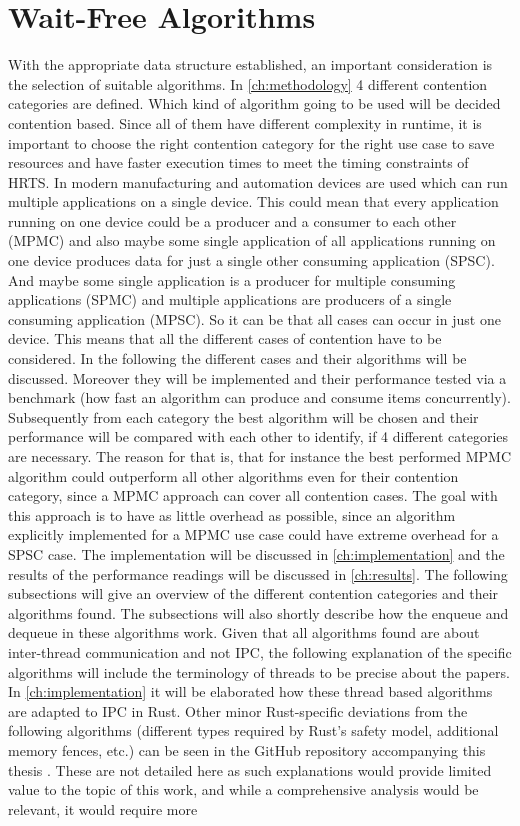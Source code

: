 \section{Wait-Free Algorithms}\label{sec:wait-free-alg}
With the appropriate data structure established, an important consideration is the selection of suitable algorithms. In \cref{ch:methodology} 4 different contention categories are defined. Which kind of algorithm going to be used will be decided contention based. Since all of them have different complexity in runtime, it is important to choose the right contention category for the right use case to save resources and have faster execution times to meet the timing constraints of \ac{HRTS}. In modern manufacturing and automation devices are used which can run multiple applications on a single device. This could mean that every application running on one device could be a producer and a consumer to each other (\ac{MPMC}) and also maybe some single application of all applications running on one device produces data for just a single other consuming application (\ac{SPSC}). And maybe some single application is a producer for multiple consuming applications (\ac{SPMC}) and multiple applications are producers of a single consuming application (\ac{MPSC}). So it can be that all cases can occur in just one device. This means that all the different cases of contention have to be considered. In the following the different cases and their algorithms will be discussed. Moreover they will be implemented and their performance tested via a benchmark (how fast an algorithm can produce and consume items concurrently). Subsequently from each category the best algorithm will be chosen and their performance will be compared with each other to identify, if 4 different categories are necessary. The reason for that is, that for instance the best performed \ac{MPMC} algorithm could outperform all other algorithms even for their contention category, since a \ac{MPMC} approach can cover all contention cases. The goal with this approach is to have as little overhead as possible, since an algorithm explicitly implemented for a \ac{MPMC} use case could have extreme overhead for a \ac{SPSC} case. The implementation will be discussed in \cref{ch:implementation} and the results of the performance readings will be discussed in \cref{ch:results}. The following subsections will give an overview of the different contention categories and their algorithms found. The subsections will also shortly describe how the enqueue and dequeue in these algorithms work. Given that all algorithms found are about inter-thread communication and not \ac{IPC}, the following explanation of the specific algorithms will include the terminology of threads to be precise about the papers. In \cref{ch:implementation} it will be elaborated how these thread based algorithms are adapted to \ac{IPC} in Rust. Other minor Rust-specific deviations from the following algorithms (different types required by Rust's safety model, additional memory fences, etc.) can be seen in the GitHub repository accompanying this thesis \cite{githubMA}. These are not detailed here as such explanations would provide limited value to the topic of this work, and while a comprehensive analysis would be relevant, it would require more 